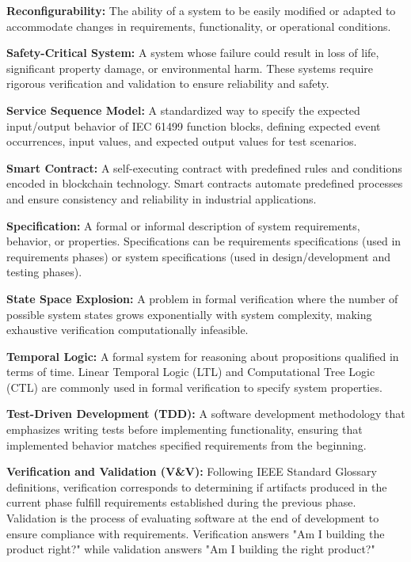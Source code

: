 \textbf{Reconfigurability:} The ability of a system to be easily modified or adapted to accommodate changes in requirements, functionality, or operational conditions.

\textbf{Safety-Critical System:} A system whose failure could result in loss of life, significant property damage, or environmental harm. These systems require rigorous verification and validation to ensure reliability and safety.

\textbf{Service Sequence Model:} A standardized way to specify the expected input/output behavior of IEC 61499 function blocks, defining expected event occurrences, input values, and expected output values for test scenarios.

\textbf{Smart Contract:} A self-executing contract with predefined rules and conditions encoded in blockchain technology. Smart contracts automate predefined processes and ensure consistency and reliability in industrial applications.

\textbf{Specification:} A formal or informal description of system requirements, behavior, or properties. Specifications can be requirements specifications (used in requirements phases) or system specifications (used in design/development and testing phases).

\textbf{State Space Explosion:} A problem in formal verification where the number of possible system states grows exponentially with system complexity, making exhaustive verification computationally infeasible.

\textbf{Temporal Logic:} A formal system for reasoning about propositions qualified in terms of time. Linear Temporal Logic (LTL) and Computational Tree Logic (CTL) are commonly used in formal verification to specify system properties.

\textbf{Test-Driven Development (TDD):} A software development methodology that emphasizes writing tests before implementing functionality, ensuring that implemented behavior matches specified requirements from the beginning.

\textbf{Verification and Validation (V\&V):} Following IEEE Standard Glossary definitions, verification corresponds to determining if artifacts produced in the current phase fulfill requirements established during the previous phase. Validation is the process of evaluating software at the end of development to ensure compliance with requirements. Verification answers "Am I building the product right?" while validation answers "Am I building the right product?"

